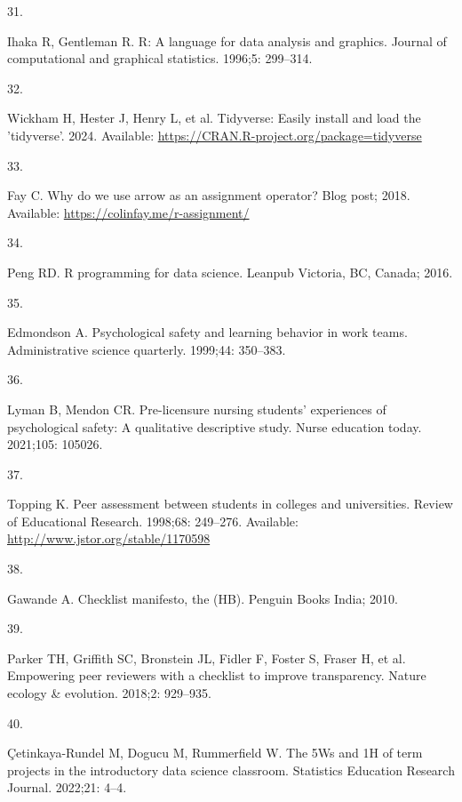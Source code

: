 \documentclass[
  10pt,
  letterpaper,
]{article}
\newlength{\cslhangindent}
\newlength{\csllabelwidth}
\newenvironment{CSLReferences}[2] %
 {\begin{list}{}{%
  \setlength{\itemindent}{0pt}
  \setlength{\leftmargin}{0pt}
  \setlength{\parsep}{0pt}
  \ifodd #1
   \setlength{\leftmargin}{\cslhangindent}
   \setlength{\itemindent}{-1\cslhangindent}
  \fi
  \setlength{\itemsep}{#2\baselineskip}}}
 {\end{list}}
\newcommand{\CSLLeftMargin}[1]{\parbox[t]{\csllabelwidth}{\strut#1\strut}}
\newcommand{\CSLRightInline}[1]{\parbox[t]{\linewidth - \csllabelwidth}{\strut#1\strut}}
\begin{document}
\begin{CSLReferences}{0}{1}
\CSLLeftMargin{31. }%
\CSLRightInline{Ihaka R, Gentleman R. R: A language for data analysis
and graphics. Journal of computational and graphical statistics. 1996;5:
299--314. }

\CSLLeftMargin{32. }%
\CSLRightInline{Wickham H, Hester J, Henry L, et al. Tidyverse: Easily
install and load the 'tidyverse'. 2024. Available:
\url{https://CRAN.R-project.org/package=tidyverse}}

\CSLLeftMargin{33. }%
\CSLRightInline{Fay C. Why do we use arrow as an assignment operator?
Blog post; 2018. Available: \url{https://colinfay.me/r-assignment/}}

\CSLLeftMargin{34. }%
\CSLRightInline{Peng RD. R programming for data science. Leanpub
Victoria, BC, Canada; 2016. }

\CSLLeftMargin{35. }%
\CSLRightInline{Edmondson A. Psychological safety and learning behavior
in work teams. Administrative science quarterly. 1999;44: 350--383. }

\CSLLeftMargin{36. }%
\CSLRightInline{Lyman B, Mendon CR. Pre-licensure nursing students'
experiences of psychological safety: A qualitative descriptive study.
Nurse education today. 2021;105: 105026. }

\CSLLeftMargin{37. }%
\CSLRightInline{Topping K. Peer assessment between students in colleges
and universities. Review of Educational Research. 1998;68: 249--276.
Available: \url{http://www.jstor.org/stable/1170598}}

\CSLLeftMargin{38. }%
\CSLRightInline{Gawande A. Checklist manifesto, the (HB). Penguin Books
India; 2010. }

\CSLLeftMargin{39. }%
\CSLRightInline{Parker TH, Griffith SC, Bronstein JL, Fidler F, Foster
S, Fraser H, et al. Empowering peer reviewers with a checklist to
improve transparency. Nature ecology \& evolution. 2018;2: 929--935. }

\CSLLeftMargin{40. }%
\CSLRightInline{Çetinkaya-Rundel M, Dogucu M, Rummerfield W. The 5Ws and
1H of term projects in the introductory data science classroom.
Statistics Education Research Journal. 2022;21: 4--4. }

\end{CSLReferences}


\end{document}
